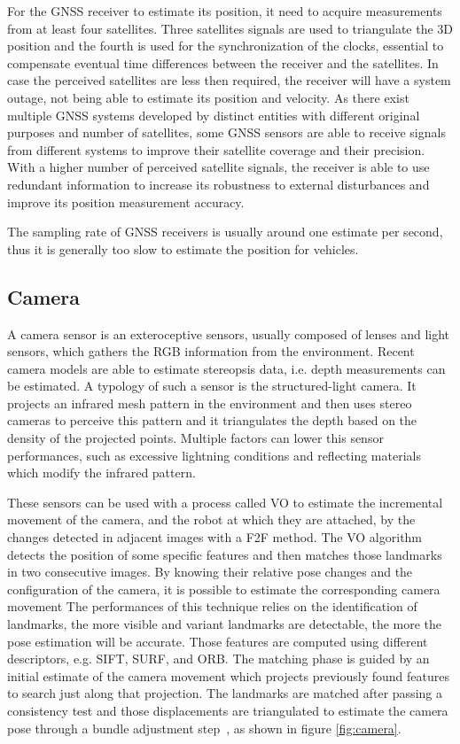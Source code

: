 For the \gls{GNSS} receiver to estimate its position, it need to acquire measurements from at least four satellites.
Three satellites signals are used to triangulate the \gls{3D} position and the fourth is used for the synchronization of the clocks, essential to compensate eventual time differences between the receiver and the satellites.
In case the perceived satellites are less then required, the receiver will have a system outage, not being able to estimate its position and velocity.
As there exist multiple \gls{GNSS} systems developed by distinct entities with different original purposes and number of satellites, some \gls{GNSS} sensors are able to receive signals from different systems to improve their satellite coverage and their precision.
With a higher number of perceived satellite signals, the receiver is able to use redundant information to increase its robustness to external disturbances and improve its position measurement accuracy.

The sampling rate of \gls{GNSS} receivers is usually around one estimate per second, thus it is generally too slow to estimate the position for vehicles.


\subsection{Camera}

\noindent A camera sensor is an exteroceptive sensors, usually composed of lenses and light sensors, which gathers the \gls{RGB} information from the environment.
Recent camera models are able to estimate stereopsis data, i.e. depth measurements can be estimated.
A typology of such a sensor is the structured-light camera. It projects an infrared mesh pattern in the environment and then uses stereo cameras to perceive this pattern and it triangulates the depth based on the density of the projected points.
Multiple factors can lower this sensor performances, such as excessive lightning conditions and reflecting materials which modify the infrared pattern.

These sensors can be used with a process called \gls{VO} to estimate the incremental movement of the camera, and the robot at which they are attached, by the changes detected in adjacent images with a \gls{F2F} method.
The \gls{VO} algorithm detects the position of some specific features and then matches those landmarks in two consecutive images.
By knowing their relative pose changes and the configuration of the camera, it is possible to estimate the corresponding camera movement
The performances of this technique relies on the identification of landmarks, the more visible and variant landmarks are detectable, the more the pose estimation will be accurate.
Those features are computed using different descriptors, e.g. \gls{SIFT}, \gls{SURF}, and \gls{ORB}.
The matching phase is guided by an initial estimate of the camera movement which projects previously found features to search just along that projection.
The landmarks are matched after passing a consistency test and those displacements are triangulated to estimate the camera pose through a bundle adjustment step~\cite{robustFusion}, as shown in figure \ref{fig:camera}.

